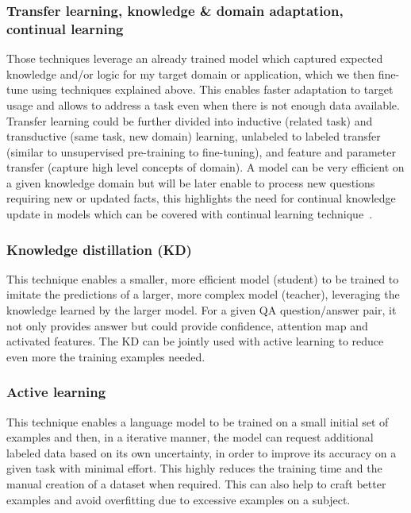 \documentclass[acmsmall]{acmart}
\begin{document}
\subsubsection{Transfer learning, knowledge \& domain adaptation, continual learning} \label{sec_supervisedtraining_transfer}
Those techniques leverage an already trained model which captured expected knowledge and/or logic for my target domain or application, which we then fine-tune using techniques explained above. This enables faster adaptation to target usage and allows to address a task even when there is not enough data available. Transfer learning could be further divided into inductive (related task) and transductive (same task, new domain) learning, unlabeled to labeled transfer (similar to unsupervised pre-training to fine-tuning), and feature and parameter transfer (capture high level concepts of domain). A model can be very efficient on a given knowledge domain but will be later enable to process new questions requiring new or updated facts, this highlights the need for continual knowledge update in models which can be covered with continual learning technique~\citep{yuanUnifiedQuestionGeneration2022, scialomFinetunedLanguageModels2022}.

\subsubsection{Knowledge distillation (KD)} \citep{boreshbanImprovingQuestionAnswering2021}\label{sec_supervisedtraining_distillation}
This technique enables a smaller, more efficient model (student) to be trained to imitate the predictions of a larger, more complex model (teacher), leveraging the knowledge learned by the larger model. For a given QA question/answer pair, it not only provides answer but could provide confidence, attention map and activated features. The KD can be jointly used with active learning to reduce even more the training examples needed.

\subsubsection{Active learning} \citep{boreshbanImprovingQuestionAnswering2021, jukicSmoothSailingImproving2022, kocielnikCanYouLabel2022, yuAcTuneUncertaintyawareActive2022, buddSurveyActiveLearning2021}\label{sec_supervisedtraining_active}
This technique enables a language model to be trained on a small initial set of examples and then, in a iterative manner, the model can request additional labeled data based on its own uncertainty, in order to improve its accuracy on a given task with minimal effort. This highly reduces the training time and the manual creation of a dataset when required. This can also help to craft better examples and avoid overfitting due to excessive examples on a subject.
\end{document}

